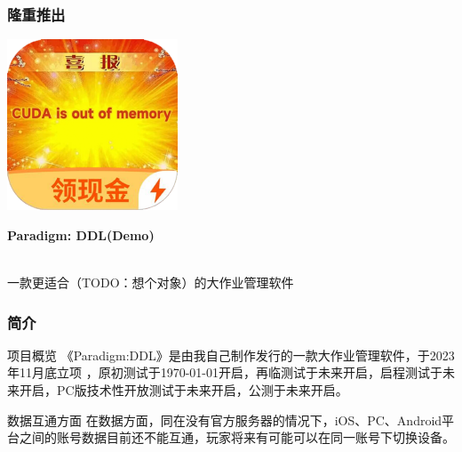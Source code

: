 \documentclass{beamer}
\begin{document}
	\begin{frame}
		\frametitle{隆重推出}
        \begin{center}
            \begin{minipage}[l]{.3\textwidth}
                \includegraphics[width=.9\textwidth]{launcher_icon.png}
            \end{minipage}
            \begin{minipage}[r]{.6\textwidth}
                \begin{Large}
                    \textbf{Paradigm: DDL\quad (Demo)}
                \end{Large}
                \medskip
                \\ \scriptsize{一款更适合（TODO：想个对象）的大作业管理软件}
            \end{minipage}
        \end{center}
		
        
	\end{frame}

    \begin{frame}
        \frametitle{简介}
        \vfill
        \begin{block}{项目概览}
        《Paradigm:DDL》是由我自己制作发行的一款大作业管理软件，于2023年11月底立项 ，原初测试于\today 开启，再临测试于未来开启，启程测试于未来开启，PC版技术性开放测试于未来开启，公测于未来开启。
        \end{block}
        \vfill
        \begin{block}{数据互通方面}
            在数据方面，同在没有官方服务器的情况下，iOS、PC、Android平台之间的账号数据目前还不能互通，玩家将来有可能可以在同一账号下切换设备。
        \end{block}
        \vfill
    \end{frame}
\end{document}
